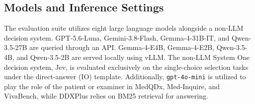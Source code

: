 






\subsection{Models and Inference Settings}
\label{app:model_inference_settings}

The evaluation suite utilizes eight large language models alongside a non-LLM decision system. GPT-5.6-Luna, Gemini-3.8-Flash, Gemma-4-31B-IT, and Qwen-3.5-27B are queried through an API. Gemma-4-E4B, Gemma-4-E2B, Qwen-3.5-4B, and Qwen-3.5-2B are served locally using vLLM. The non-LLM System One decision system, Jev, is evaluated exclusively on the single-choice selection tasks under the direct-answer (IO) template. 
Additionally, \texttt{gpt-4o-mini} is utilized to play the role of the patient or examiner in MedQDx, Med-Inquire, and VivaBench, while DDXPlus relies on BM25 retrieval for answering.


